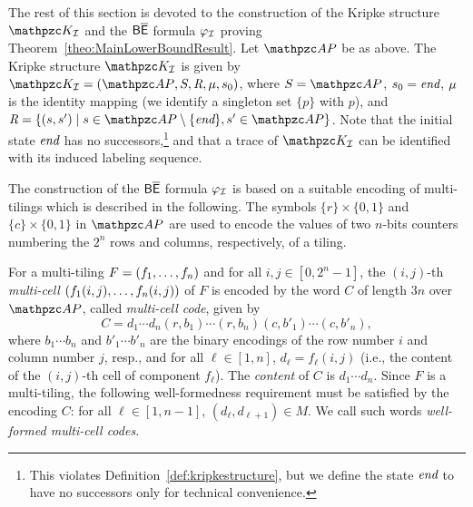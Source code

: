 
The rest of this section is devoted to the construction of the Kripke structure $\Ku_\Instance$ and the $\mathsf{B\overline{E}}$ formula
$\varphi_{\mathcal{I}}$ proving Theorem~\ref{theo:MainLowerBoundResult}. Let $\Prop$ be as above. The Kripke structure $\Ku_\Instance$ is given by
$\Ku_\Instance=\KuDef$, where $\States=\Prop$, $s_0=\textit{end}$, $\mu$ is the identity mapping (we identify
a singleton set $\{p\}$ with $p$), and $\Trans = \{(s,s') \mid s\in \Prop\setminus \{\End\}, s'\in\Prop\}$. Note that the initial state $\textit{end}$ has no successors,\footnote{This violates Definition~\ref{def:kripkestructure}, but we define the state $\textit{end}$ to have no successors only for technical convenience.}
and that a trace of $\Ku_\Instance$ can be identified with its induced labeling sequence.

The construction of the $\mathsf{B\overline{E}}$ formula
$\varphi_{\mathcal{I}}$ is based on a suitable encoding of multi-tilings which is described in the following. The symbols
$\{r\}\times   \{0,1\}$ and  $\{c\} \times \{0,1\}$ in $\Prop$
are used to encode the values of two $n$-bits counters numbering the $2^{n}$ rows and  columns, respectively, of a  tiling.

For a multi-tiling $F=(f_1,\ldots,f_n)$ and for all $i,j\in [0,2^{n}-1]$, the $(i,j)$-{th} \emph{multi-cell} $(f_1(i,j),\ldots,f_n(i,j))$ of $F$ is encoded by
the word $C$ of length $3n$ over $\Prop$, called \emph{multi-cell code}, given by
\[C= d_1 \cdots d_n (r, b_1)\cdots(r, b_n)(c,b'_1)\cdots(c, b'_n),\]
where $b_1 \cdots b_n$ and $b'_1\cdots b'_n$ are the binary encodings of the row number $i$ and column number $j$, resp., and for all $\ell\in[1,n]$, $d_\ell= f_\ell(i,j)$ (i.e., the content of the $(i,j)$-th cell of component $f_\ell$).
The \emph{content} of  $C$ is $d_1\cdots d_n$. 
%
Since $F$ is a multi-tiling,  the following well-formedness requirement must  be satisfied by the encoding $C$: for all $\ell\in [1,n-1]$, $(d_\ell,d_{\ell+1})\in M$. We call such words \emph{well-formed multi-cell codes}.

